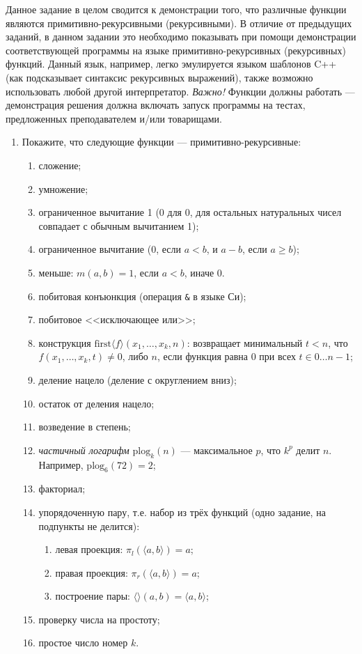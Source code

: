 \documentclass[10pt,a4paper,oneside]{article}
\begin{document}
Данное задание в целом сводится к демонстрации того, что различные функции являются
примитивно-рекурсивными (рекурсивными). В отличие от предыдущих заданий, в данном задании
это необходимо показывать при помощи демонстрации соответствующей программы на языке 
примитивно-рекурсивных (рекурсивных) функций.
Данный язык, например, легко эмулируется языком шаблонов C++ (как подсказывает синтаксис 
рекурсивных выражений), также возможно использовать любой другой интерпретатор.
\emph{Важно!} Функции должны работать --- демонстрация решения должна включать
запуск программы на тестах, предложенных преподавателем и/или товарищами.

\begin{enumerate}
\item Покажите, что следующие функции --- примитивно-рекурсивные:

\begin{enumerate}
\item сложение;
\item умножение;
\item ограниченное вычитание 1 (0 для 0, для остальных натуральных чисел совпадает с обычным вычитанием 1);
\item ограниченное вычитание (0, если $a < b$, и $a-b$, если $a \ge b$);
\item меньше: $m(a,b) = 1$, если $a < b$, иначе 0.
\item побитовая конъюнкция (операция \verb!&! в языке Си);
\item побитовое <<исключающее или>>;
\item конструкция $\textrm{first}\langle f \rangle(x_1,\dots,x_k,n)$: возвращает минимальный $t < n$, что
$f(x_1,\dots,x_k,t) \ne 0$, либо $n$, если функция равна 0 при всех $t \in 0\dots {n-1}$;
\item деление нацело (деление с округлением вниз);
\item остаток от деления нацело;
\item возведение в степень;
\item \emph{частичный логарифм} $\textrm{plog}_k(n)$ --- максимальное $p$, что $k^p$ делит $n$.
Например, $\textrm{plog}_6(72) = 2$;
\item факториал;
\item упорядоченную пару, т.е. набор из трёх функций (одно задание, на подпункты не делится):
\begin{enumerate}
\item левая проекция: $\pi_l (\langle a,b\rangle) = a$;
\item правая проекция: $\pi_r (\langle a,b\rangle) = a$;
\item построение пары: $\langle\rangle (a,b) = \langle a,b\rangle$;
\end{enumerate}
\item проверку числа на простоту;
\item простое число номер $k$.
\end{enumerate}


\end{enumerate}
\end{document}
